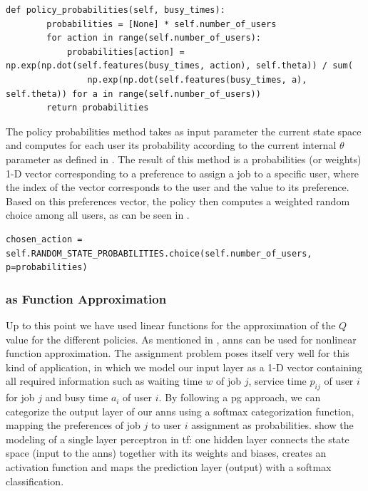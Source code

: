\begin{lstlisting}[caption=Softmax distribution of preferences probabilities,label=lst:softmax_probabilities,style=CustomPython]
    def policy_probabilities(self, busy_times):
        probabilities = [None] * self.number_of_users
        for action in range(self.number_of_users):
            probabilities[action] = np.exp(np.dot(self.features(busy_times, action), self.theta)) / sum(
                np.exp(np.dot(self.features(busy_times, a), self.theta)) for a in range(self.number_of_users))
        return probabilities
\end{lstlisting}

The policy probabilities method takes as input parameter the current state space and computes for each user its probability according to the current internal $\theta$ parameter as defined in . The result of this method is a probabilities (or weights) 1-D vector corresponding to a preference to assign a job to a specific user, where the index of the vector corresponds to the user and the value to its preference. Based on this preferences vector, the policy then computes a weighted random choice among all users, as can be seen in .

\begin{lstlisting}[caption=Probabilistic user choice,label=lst:prob_user_choice,style=CustomPython]
	chosen_action = self.RANDOM_STATE_PROBABILITIES.choice(self.number_of_users, p=probabilities)
\end{lstlisting}

\subsubsection{ as Function Approximation}

Up to this point we have used linear functions for the approximation of the $Q$ value for the different policies. As mentioned in , \glspl{ann} can be used for nonlinear function approximation. The assignment problem  poses itself very well for this kind of application, in which we model our input layer as a 1-D vector containing all required information such as waiting time $w$ of job $j$, service time $p_{ij}$ of user $i$ for job $j$ and busy time $a_i$ of user $i$. By following a \gls{pg} approach, we can categorize the output layer of our \glspl{ann} using a softmax categorization function, mapping the preferences of job $j$ to user $i$ assignment as probabilities.  show the modeling of a single layer perceptron in \gls{tf}: one hidden layer connects the state space (\ie input to the \glspl{ann}) together with its weights and biases, creates an activation function and maps the prediction layer (\ie output) with a softmax classification.

